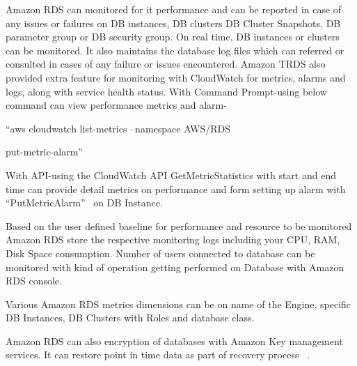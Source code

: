 Amazon RDS can monitored for it performance and can be reported in case of 
any issues or failures on DB instances, DB clusters DB Cluster Snapshots, DB 
parameter group or DB security group.
On real time, DB instances or clusters can be monitored. It also maintains the 
database log files which can referred or consulted in cases of any failure or 
issues encountered.  
Amazon TRDS also provided extra feature for monitoring with CloudWatch for 
metrics, alarms and logs, along with service health status.
With Command Prompt-using below command can view performance metrics and 
alarm- 

``aws cloudwatch list-metrics --namespace AWS/RDS

put-metric-alarm''~\cite{hid-sp18-520-amardsmon}

With API-using the CloudWatch API GetMetricStatistics with start and end time 
can provide detail metrics on performance and form setting up alarm 
with ``PutMetricAlarm''~\cite{hid-sp18-520-amardsmon} on DB Instance.

Based on the user defined baseline for performance and resource to be monitored 
Amazon RDS store the respective monitoring logs including your CPU, RAM, Disk 
Space consumption.
Number of users connected to database can be monitored with kind of operation 
getting performed on Database with Amazon RDS console.  

Various Amazon RDS metrics dimensions can be on name of the Engine, specific 
DB Instances, DB Clusters with Roles and database class.

Amazon RDS can also encryption of databases with Amazon Key management services. 
It can restore point in time data as part of recovery process
~\cite{hid-sp18-520-amardsmon}.


